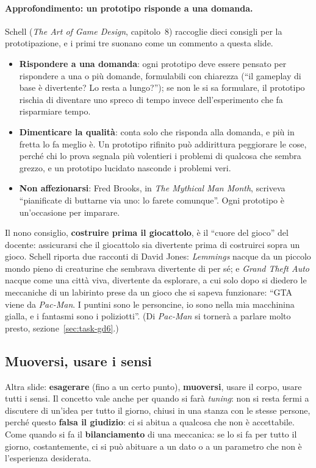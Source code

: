 \paragraph{Approfondimento: un prototipo risponde a una domanda.} Schell
(\emph{The Art of Game Design}, capitolo~8) raccoglie dieci consigli per la
prototipazione, e i primi tre suonano come un commento a questa slide.
\begin{itemize}
  \item \textbf{Rispondere a una domanda}: ogni prototipo deve essere pensato
        per rispondere a una o più domande, formulabili con chiarezza (``il
        gameplay di base è divertente? Lo resta a lungo?''); se non le si sa
        formulare, il prototipo rischia di diventare uno spreco di tempo
        invece dell'esperimento che fa risparmiare tempo.
  \item \textbf{Dimenticare la qualità}: conta solo che risponda alla
        domanda, e più in fretta lo fa meglio è. Un prototipo rifinito può
        addirittura peggiorare le cose, perché chi lo prova segnala più
        volentieri i problemi di qualcosa che sembra grezzo, e un prototipo
        lucidato nasconde i problemi veri.
  \item \textbf{Non affezionarsi}: Fred Brooks, in \emph{The Mythical Man
        Month}, scriveva ``pianificate di buttarne via uno: lo farete
        comunque''. Ogni prototipo è un'occasione per imparare.
\end{itemize}
Il nono consiglio, \textbf{costruire prima il giocattolo}, è il ``cuore del
gioco'' del docente: assicurarsi che il giocattolo sia divertente prima di
costruirci sopra un gioco. Schell riporta due racconti di David Jones:
\emph{Lemmings} nacque da un piccolo mondo pieno di creaturine che sembrava
divertente di per sé; e \emph{Grand Theft Auto} nacque come una città viva,
divertente da esplorare, a cui solo dopo si diedero le meccaniche di un
labirinto prese da un gioco che si sapeva funzionare: ``GTA viene da
\emph{Pac-Man}. I puntini sono le personcine, io sono nella mia macchinina
gialla, e i fantasmi sono i poliziotti''. (Di \emph{Pac-Man} si tornerà a
parlare molto presto, sezione~\ref{sec:task-gd6}.)

\subsection{Muoversi, usare i sensi}

Altra slide: \textbf{esagerare} (fino a un certo punto), \textbf{muoversi},
usare il corpo, usare tutti i sensi. Il concetto vale anche per quando si
farà \emph{tuning}: non si resta fermi a discutere di un'idea per tutto il
giorno, chiusi in una stanza con le stesse persone, perché questo
\textbf{falsa il giudizio}: ci si abitua a qualcosa che non è accettabile.
Come quando si fa il \textbf{bilanciamento} di una meccanica: se lo si fa per
tutto il giorno, costantemente, ci si può abituare a un dato o a un parametro
che non è l'esperienza desiderata.

